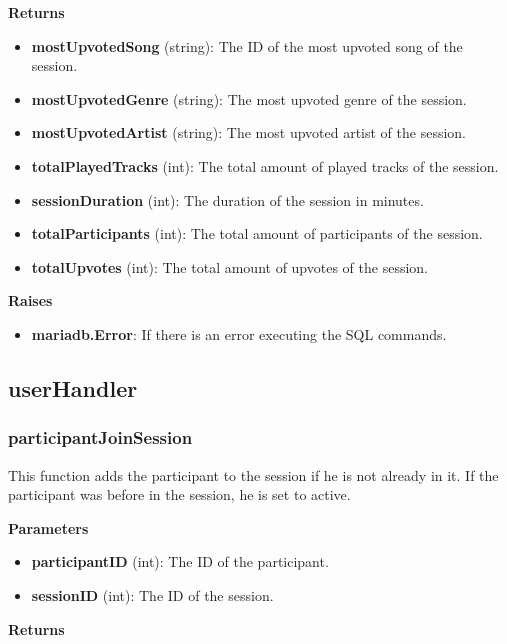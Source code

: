 \documentclass[oneside, nenglish]{sdqtechreport}
\begin{document}
\begin{itemize}
\textbf{Returns}

\begin{itemize}
    \item \textbf{mostUpvotedSong} (string): The ID of the most upvoted song of the session.
    \item \textbf{mostUpvotedGenre} (string): The most upvoted genre of the session.
    \item \textbf{mostUpvotedArtist} (string): The most upvoted artist of the session.
    \item \textbf{totalPlayedTracks} (int): The total amount of played tracks of the session.
    \item \textbf{sessionDuration} (int): The duration of the session in minutes.
    \item \textbf{totalParticipants} (int): The total amount of participants of the session.
    \item \textbf{totalUpvotes} (int): The total amount of upvotes of the session.
\end{itemize}

\textbf{Raises}

\begin{itemize}
    \item \textbf{mariadb.Error}: If there is an error executing the SQL commands.
\end{itemize}



\subsection{userHandler}

\subsubsection{participantJoinSession}

This function adds the participant to the session if he is not already in it. If the participant was before in the session, he is set to active.

\textbf{Parameters}

\begin{itemize}
    \item \textbf{participantID} (int): The ID of the participant.
    \item \textbf{sessionID} (int): The ID of the session.
\end{itemize}

\textbf{Returns}


\end{itemize}
\end{document}
